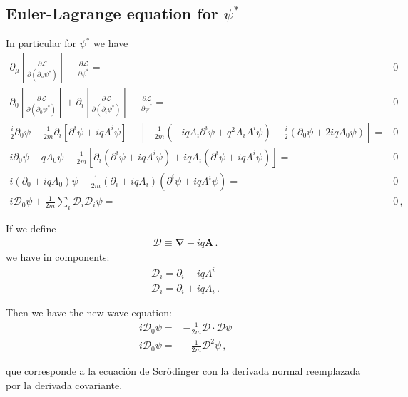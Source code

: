 \subsection{Euler-Lagrange equation for $\psi^*$}
In particular for $\psi^*$ we have
\begin{align}
  \partial_\mu\left[\frac{\partial\mathcal{L}}{\partial(\partial_\mu\psi^*)}\right]-\frac{\partial\mathcal{L}}{\partial\psi^*}=&0\nonumber\\
  \partial_0\left[\frac{\partial\mathcal{L}}{\partial(\partial_0\psi^*)}\right]+\partial_i\left[\frac{\partial\mathcal{L}}{\partial(\partial_i\psi^*)}\right]-\frac{\partial\mathcal{L}}{\partial\psi^*}=&0\nonumber\\
  \frac{i}{2}\partial_0\psi-\frac{1}{2m}\partial_i\left[\partial^i\psi+i q A^i\psi\right]
-\left[-\frac{1}{2m}\left(-i q A_i\partial^i\psi+q^2A_iA^i\psi\right)
-\frac{i}{2}\left(\partial_0\psi+2 i q A_0\psi\right)\right]=&0\nonumber\\
  i\partial_0\psi-q A_0\psi-\frac{1}{2m}\left[\partial_i\left(\partial^i\psi+i q A^i\psi\right)
+i q A_i\left(\partial^i\psi+i q A^i\psi\right)\right]
=&0\nonumber\\
  i(\partial_0+i q A_0)\psi-\frac{1}{2m}(\partial_i+i q A_i)(\partial^i\psi+i q A^i\psi)
=&0\nonumber\\
   i\mathcal{D}_0\psi
  +\frac{1}{2m}\sum_i\mathcal{D}_i\mathcal{D}_i\psi=&0\,,
\end{align}

If we define
\begin{align}
  \boldsymbol{\mathcal{D}}\equiv\boldsymbol{\nabla}-i q \mathbf{A}\,.
\end{align}
we have in components:
\begin{align}
    \boldsymbol{\mathcal{D}}_i=\partial_i-i q A^i\nonumber\\
    \boldsymbol{\mathcal{D}}_i=\partial_i+i q A_i\,.
\end{align}

Then we have the new wave equation:
\begin{align}
  i\mathcal{D}_0\psi=&-\frac{1}{2m}\boldsymbol{\mathcal{D}}\cdot\boldsymbol{\mathcal{D}}\psi\nonumber\\
i\mathcal{D}_0\psi=&-\frac{1}{2m}\boldsymbol{\mathcal{D}}^2\psi\,,
\end{align}

que corresponde a la ecuación de Scrödinger con la derivada normal reemplazada por la derivada covariante.



